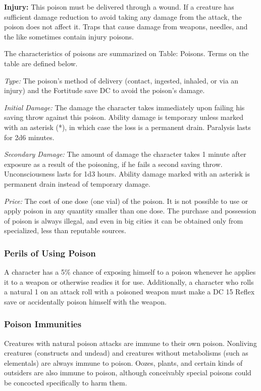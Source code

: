 \textbf{Injury:} This poison must be delivered through a wound. If a creature has 
sufficient damage reduction to avoid taking any damage from the attack, the poison 
does not affect it. Traps that cause damage from weapons, needles, and the like 
sometimes contain injury poisons.

The characteristics of poisons are summarized on Table: Poisons. Terms on the table 
are defined below.

\textit{Type:} The poison's method of delivery (contact, ingested, inhaled, or 
via an injury) and the Fortitude save DC to avoid the poison's damage.

\textit{Initial Damage:} The damage the character takes immediately upon failing 
his saving throw against this poison. Ability damage is temporary unless marked 
with an asterisk (*), in which case the loss is a permanent drain. Paralysis lasts 
for 2d6 minutes.

\textit{Secondary Damage:} The amount of damage the character takes 1 minute after 
exposure as a result of the poisoning, if he fails a second saving throw. Unconsciousness 
lasts for 1d3 hours. Ability damage marked with an asterisk is permanent drain 
instead of temporary damage.

\textit{Price:} The cost of one dose (one vial) of the poison. It is not possible 
to use or apply poison in any quantity smaller than one dose. The purchase and 
possession of poison is always illegal, and even in big cities it can be obtained 
only from specialized, less than reputable sources.

\subsubsection{Perils of Using Poison}

A character has a 5\% chance of exposing himself to a poison whenever he applies 
it to a weapon or otherwise readies it for use. Additionally, a character who rolls 
a natural 1 on an attack roll with a poisoned weapon must make a DC 15 Reflex save 
or accidentally poison himself with the weapon.

\subsubsection{Poison Immunities}

Creatures with natural poison attacks are immune to their own poison. Nonliving 
creatures (constructs and undead) and creatures without metabolisms (such as elementals) 
are always immune to poison. Oozes, plants, and certain kinds of outsiders are 
also immune to poison, although conceivably special poisons could be concocted 
specifically to harm them.

